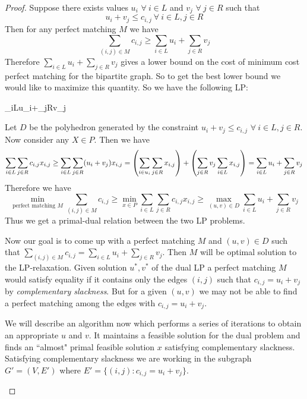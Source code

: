 \begin{proof}
	Suppose there exists values $u_i$ $\forall\ i\in L$ and $v_j$ $\forall\ j\in R$ such that $$u_i+v_j\leq c_{i,j}\ \forall\ i\in L, j\in R$$Then for any perfect matching $M$ we have $$\sum_{(i,j)\in M}c_{i,j}\geq \sum_{i\in L}u_i+\sum_{j\in R}v_j$$Therefore $\sum\limits_{i\in L}u_i+\sum\limits_{j\in R}v_j$ gives a lower bound on the cost of minimum cost perfect matching for the bipartite graph. So to get the best lower bound we would like to maximize this quantity. So we have the following LP:
	\begin{maxi*}{}{\sum_{i\in L}u_i+\sum_{j\in R}v_j}{}{}
	\end{maxi*}Let $D$ be the polyhedron generated by the constraint $u_i+v_j\leq c_{i,j}$ $\forall\ i\in L,j\in R$. Now consider any $X\in P$. Then we have $$\sum_{i\in L}\sum_{j\in R}c_{i,j}x_{i,j}\geq \sum_{i\in L}\sum_{j\in R}(u_i+v_j)x_{i,j}=\left(\sum_{i\in u_i}\sum_{j\in R}x_{i,j}\right)+\left(\sum_{j\in R}v_j\sum_{i\in L}x_{i,j}\right)=\sum_{i\in L}u_i+\sum_{j\in R}v_j$$Therefore we have $$\min\limits_{\text{perfect matching $M$}}\sum_{(i,j)\in M}c_{i,j}\geq \min\limits_{x\in P}\sum_{i\in L}\sum_{j\in R}c_{i,j}x_{i,j}\geq \max\limits_{(u,v)\in D}\sum_{i\in L}u_i+\sum_{j\in R}v_j$$Thus we get a primal-dual relation between the two LP problems.
	
	Now our goal is to come up with a perfect matching $M$ and $(u,v)\in D$ such that $\sum\limits_{(i,j)\in M}c_{i,j}=\sum\limits_{i\in L}u_i+\sum\limits_{j\in R}v_j$. Then $M$ will be optimal solution to the LP-relaxation. Given solution $u^*,v^*$ of the dual LP a perfect matching $M$ would satisfy equality if it contains only the edges $(i,j)$ such that $c_{i,j}=u_i+v_j$ by \textit{complementary slackness}. But for a given $(u,v)$ we may not be able to find a perfect matching among the edges with $c_{i,j}=u_i+v_j$. 
	
	We will describe an algorithm now which performs a series of iterations to obtain an appropriate $u$ and $v$. It maintains a feasible solution for the dual problem and finds an ``almost" primal feasible solution $x$ satisfying complementary slackness. Satisfying complementary slackness we are working in the subgraph $G'=(V,E')$ where $E'=\{(i,j)\colon c_{i,j}=u_i+v_j\}$.
	\begin{algorithm}\DontPrintSemicolon
		\caption{}
	\end{algorithm}
	

\end{proof}

